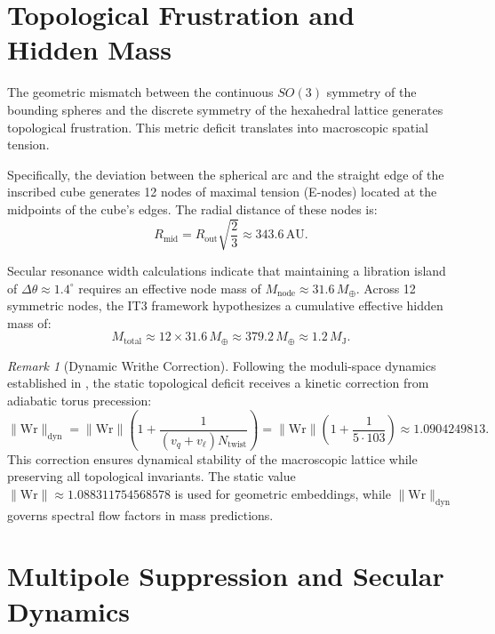 \documentclass[11pt,a4paper]{article}
\theoremstyle{remark}
\newtheorem{remark}[theorem]{Remark}
\newcommand{\AU}{\,\mathrm{AU}}
\newcommand{\Mearth}{\,M_\oplus}
\newcommand{\Mjup}{\,M_{\mathrm{J}}}
\newcommand{\Wr}{\mathrm{Wr}}
\newcommand{\WrStaticVal}{1.088311754568578}
\newcommand{\WrDynVal}{1.0904249813}
\newcommand{\vLepton}{v_\ell}
\newcommand{\vQuark}{v_q}
\begin{document}
\section{Topological Frustration and Hidden Mass}

The geometric mismatch between the continuous $SO(3)$ symmetry of the bounding spheres and the discrete symmetry of the hexahedral lattice generates topological frustration. This metric deficit translates into macroscopic spatial tension.

Specifically, the deviation between the spherical arc and the straight edge of the inscribed cube generates 12 nodes of maximal tension (E-nodes) located at the midpoints of the cube's edges. The radial distance of these nodes is:
\begin{equation}
    R_{\text{mid}} = R_{\text{out}} \sqrt{\frac{2}{3}} \approx 343.6\AU.
    \label{eq:mid_radius}
\end{equation}

Secular resonance width calculations indicate that maintaining a libration island of $\Delta \theta \approx 1.4^\circ$ requires an effective node mass of $M_{\text{node}} \approx 31.6\Mearth$. Across 12 symmetric nodes, the IT3 framework hypothesizes a cumulative effective hidden mass of:
\begin{equation}
    M_{\text{total}} \approx 12 \times 31.6\Mearth \approx 379.2\Mearth \approx 1.2\Mjup.
    \label{eq:total_mass}
\end{equation}

\begin{remark}[Dynamic Writhe Correction]
\label{rem:dynamic_writhe}
Following the moduli-space dynamics established in \cite{logvinovich2026}, the static topological deficit receives a kinetic correction from adiabatic torus precession:
\begin{equation}
    \| \Wr \|_{\text{dyn}} = \| \Wr \| \left(1 + \frac{1}{(\vQuark + \vLepton) N_{\text{twist}}}\right) 
    = \| \Wr \| \left(1 + \frac{1}{5 \cdot 103}\right) \approx \WrDynVal.
\end{equation}
This correction ensures dynamical stability of the macroscopic lattice while preserving all topological invariants. The static value $\| \Wr \| \approx \WrStaticVal$ is used for geometric embeddings, while $\| \Wr \|_{\text{dyn}}$ governs spectral flow factors in mass predictions.
\end{remark}

\section{Multipole Suppression and Secular Dynamics}
\label{sec:stealth}
\end{document}
